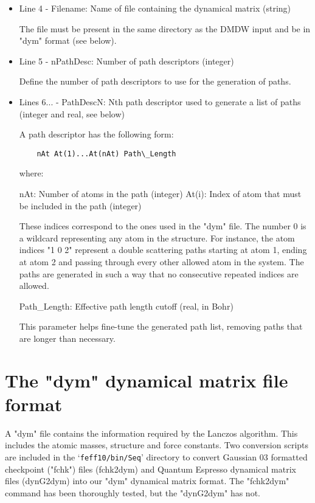 \documentclass[11pt,oneside]{report} %
\newcommand{\file}[1]{`\texttt{#1}'}
\begin{document}
\begin{latexonly}
\begin{itemize}
\item Line  4 - Filename: Name of file containing the dynamical matrix (string)

  The file must be present in the same directory as the DMDW input and be in
  "dym" format (see below).

\item Line  5 - nPathDesc: Number of path descriptors (integer)

  Define the number of path descriptors to use for the generation of paths.
  
\item Lines 6... - PathDescN: Nth path descriptor used to generate a list of paths
                        (integer and real, see below)

  A path descriptor has the following form:
\begin{verbatim}  
    nAt At(1)...At(nAt) Path\_Length
\end{verbatim}    
  where:
  
    nAt: Number of atoms in the path (integer)
    At(i): Index of atom that must be included in the path (integer)

		These indices correspond to the ones used in the "dym" file. The
		number 0 is a wildcard representing any atom in the structure.
		For instance, the atom indices "1 0 2" represent a double
		scattering paths starting at atom 1, ending at atom 2 and
		passing through every other allowed atom in the system. The
		paths are generated in such a way that no consecutive repeated
		indices are allowed.

    Path\_Length: Effective path length cutoff (real, in Bohr)
    
		This parameter helps fine-tune the generated path list, removing
		paths that are longer than necessary.
\end{itemize}



 \section{The "dym" dynamical matrix file format}

  A "dym" file contains the information required by the Lanczos algorithm. This
  includes the atomic masses, structure and force constants. Two conversion
  scripts are included in the \file{feff10/bin/Seq} directory to convert Gaussian 03 formatted
  checkpoint ("fchk") files (fchk2dym) and Quantum Espresso dynamical matrix
  files (dynG2dym) into our "dym" dynamical matrix format. The "fchk2dym"
  command has been thoroughly tested, but the "dynG2dym" has not. 
  

\end{latexonly}
\end{document}
